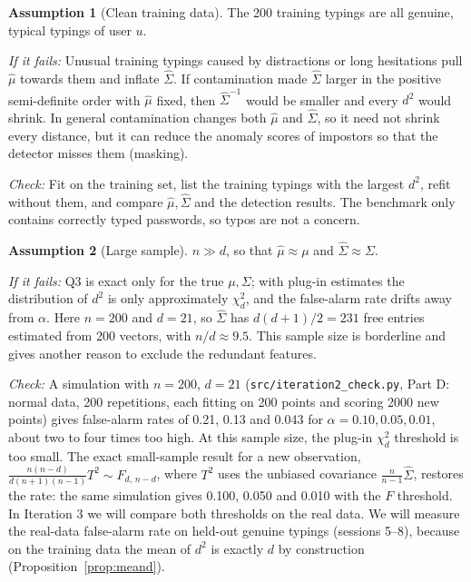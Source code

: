 \documentclass[11pt]{article}
\theoremstyle{definition}
\newtheorem{assumption}{Assumption}
\begin{document}
\begin{assumption}[Clean training data]\label{as:clean}
The 200 training typings are all genuine, typical typings of user $u$.
\end{assumption}
\noindent\textit{If it fails:} Unusual training typings caused by distractions or long hesitations pull $\hat\mu$ towards them and inflate $\hat\Sigma$. If contamination made $\hat\Sigma$ larger in the positive semi-definite order with $\hat\mu$ fixed, then $\hat\Sigma^{-1}$ would be smaller and every $d^2$ would shrink. In general contamination changes both $\hat\mu$ and $\hat\Sigma$, so it need not shrink every distance, but it can reduce the anomaly scores of impostors so that the detector misses them (masking).

\noindent\textit{Check:} Fit on the training set, list the training typings with the largest $d^2$, refit without them, and compare $\hat\mu,\hat\Sigma$ and the detection results. The benchmark only contains correctly typed passwords, so typos are not a concern.

\begin{assumption}[Large sample]\label{as:large}
$n\gg d$, so that $\hat\mu\approx\mu$ and $\hat\Sigma\approx\Sigma$.
\end{assumption}
\noindent\textit{If it fails:} Q3 is exact only for the true $\mu,\Sigma$; with plug-in estimates the distribution of $d^2$ is only approximately $\chi^2_d$, and the false-alarm rate drifts away from $\alpha$. Here $n=200$ and $d=21$, so $\hat\Sigma$ has $d(d+1)/2=231$ free entries estimated from 200 vectors, with $n/d\approx9.5$. This sample size is borderline and gives another reason to exclude the redundant features.

\noindent\textit{Check:} A simulation with $n=200$, $d=21$ (\texttt{src/iteration2\_check.py}, Part D: normal data, 200 repetitions, each fitting on 200 points and scoring 2000 new points) gives false-alarm rates of 0.21, 0.13 and 0.043 for $\alpha=0.10,0.05,0.01$, about two to four times too high. At this sample size, the plug-in $\chi^2_d$ threshold is too small. The exact small-sample result for a new observation,
$\frac{n(n-d)}{d(n+1)(n-1)}T^2\sim F_{d,\,n-d}$, where $T^2$ uses the unbiased covariance $\frac{n}{n-1}\hat\Sigma$, restores the rate: the same simulation gives 0.100, 0.050 and 0.010 with the $F$ threshold. In Iteration 3 we will compare both thresholds on the real data. We will measure the real-data false-alarm rate on held-out genuine typings (sessions 5--8), because on the training data the mean of $d^2$ is exactly $d$ by construction (Proposition~\ref{prop:meand}).
\end{document}
